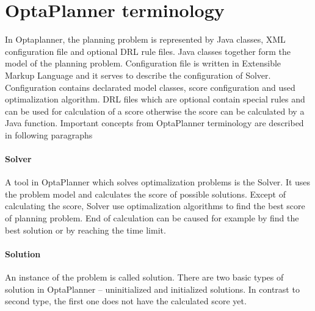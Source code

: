 \section{OptaPlanner terminology}\label{OptaPlannerTerminologySection}
In Optaplanner, the planning problem is represented by Java classes, XML configuration file and optional DRL rule files.
Java classes together form the model of the planning problem. Configuration file is written in Extensible Markup
Language and it serves to describe the configuration of Solver. Configuration contains declarated model classes, score
configuration and used optimalization algorithm. DRL files which are optional contain special rules and can be used for
calculation of a score otherwise the score can be calculated by a Java function. Important concepts from OptaPlanner
terminology are described in following paragraphs

\paragraph{Solver}
A tool in OptaPlanner which solves optimalization problems is the Solver. It uses the problem model and calculates the score of possible solutions. Except of calculating the score, Solver use optimalization algorithms to find the best score of planning problem. End of calculation can be caused for example by find the best solution or by reaching the time limit.

\paragraph{Solution}
An instance of the problem is called solution. There are two basic types of solution in OptaPlanner -- uninitialized and initialized solutions. In contrast to second type, the first one does not have the calculated score yet.

